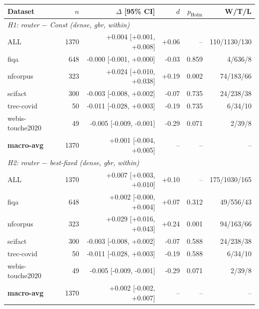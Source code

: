 \begin{tabular}{lrrrrr}
\hline
Dataset & $n$ & $\Delta$ [95\% CI] & $d$ & $p_{\mathrm{Holm}}$ & W/T/L \\
\hline
\multicolumn{6}{l}{\textit{H1: router $-$ Const (dense, gbr, within)}} \\
ALL & 1370 & +0.004 [+0.001, +0.008] & +0.06 & -- & 110/1130/130 \\
fiqa & 648 & -0.000 [-0.001, +0.000] & -0.03 & 0.859 & 4/636/8 \\
nfcorpus & 323 & +0.024 [+0.010, +0.038] & +0.19 & 0.002 & 74/183/66 \\
scifact & 300 & -0.003 [-0.008, +0.002] & -0.07 & 0.735 & 24/238/38 \\
trec-covid & 50 & -0.011 [-0.028, +0.003] & -0.19 & 0.735 & 6/34/10 \\
webis-touche2020 & 49 & -0.005 [-0.009, -0.001] & -0.29 & 0.071 & 2/39/8 \\
\textbf{macro-avg} & 1370 & +0.001 [-0.004, +0.005] & -- & -- & -- \\
\hline
\multicolumn{6}{l}{\textit{H2: router $-$ best-fixed (dense, gbr, within)}} \\
ALL & 1370 & +0.007 [+0.003, +0.010] & +0.10 & -- & 175/1030/165 \\
fiqa & 648 & +0.002 [-0.000, +0.004] & +0.07 & 0.312 & 49/556/43 \\
nfcorpus & 323 & +0.029 [+0.016, +0.043] & +0.24 & 0.001 & 94/163/66 \\
scifact & 300 & -0.003 [-0.008, +0.002] & -0.07 & 0.588 & 24/238/38 \\
trec-covid & 50 & -0.011 [-0.028, +0.003] & -0.19 & 0.588 & 6/34/10 \\
webis-touche2020 & 49 & -0.005 [-0.009, -0.001] & -0.29 & 0.071 & 2/39/8 \\
\textbf{macro-avg} & 1370 & +0.002 [-0.002, +0.007] & -- & -- & -- \\
\hline
\end{tabular}